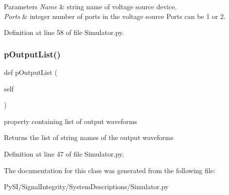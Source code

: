 \begin{DoxyParams}{Parameters}
{\em Name} & string name of voltage source device. \\
\hline
{\em Ports} & integer number of ports in the voltage source Ports can be 1 or 2. \\
\hline
\end{DoxyParams}


Definition at line 58 of file Simulator.\+py.

\mbox{\label{classSignalIntegrity_1_1SystemDescriptions_1_1Simulator_1_1Simulator_a4e93b3fc1994f14f72cdcebbf9b68127}} 
\subsubsection{\texorpdfstring{p\+Output\+List()}{pOutputList()}}
{\footnotesize\ttfamily def p\+Output\+List (\begin{DoxyParamCaption}\item[{}]{self }\end{DoxyParamCaption})}



property containing list of output waveforms 

\begin{DoxyReturn}{Returns}
the list of string names of the output waveforms 
\end{DoxyReturn}


Definition at line 47 of file Simulator.\+py.



The documentation for this class was generated from the following file\+:\begin{DoxyCompactItemize}
\item 
Py\+S\+I/\+Signal\+Integrity/\+System\+Descriptions/Simulator.\+py\end{DoxyCompactItemize}
